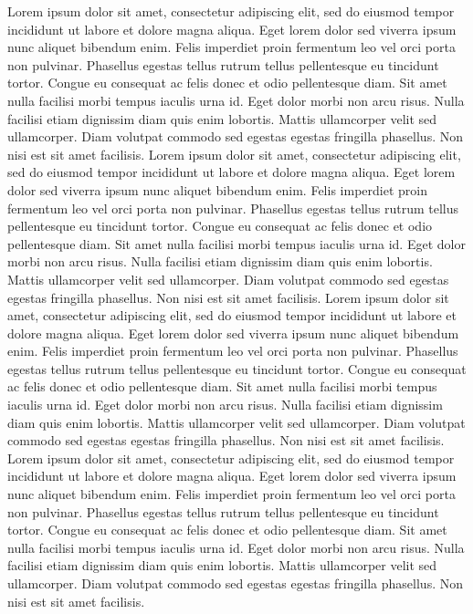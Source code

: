 \documentclass[
]{article}
\begin{document}
Lorem ipsum dolor sit amet, consectetur adipiscing elit, sed do eiusmod
tempor incididunt ut labore et dolore magna aliqua. Eget lorem dolor sed
viverra ipsum nunc aliquet bibendum enim. Felis imperdiet proin
fermentum leo vel orci porta non pulvinar. Phasellus egestas tellus
rutrum tellus pellentesque eu tincidunt tortor. Congue eu consequat ac
felis donec et odio pellentesque diam. Sit amet nulla facilisi morbi
tempus iaculis urna id. Eget dolor morbi non arcu risus. Nulla facilisi
etiam dignissim diam quis enim lobortis. Mattis ullamcorper velit sed
ullamcorper. Diam volutpat commodo sed egestas egestas fringilla
phasellus. Non nisi est sit amet facilisis. Lorem ipsum dolor sit amet,
consectetur adipiscing elit, sed do eiusmod tempor incididunt ut labore
et dolore magna aliqua. Eget lorem dolor sed viverra ipsum nunc aliquet
bibendum enim. Felis imperdiet proin fermentum leo vel orci porta non
pulvinar. Phasellus egestas tellus rutrum tellus pellentesque eu
tincidunt tortor. Congue eu consequat ac felis donec et odio
pellentesque diam. Sit amet nulla facilisi morbi tempus iaculis urna id.
Eget dolor morbi non arcu risus. Nulla facilisi etiam dignissim diam
quis enim lobortis. Mattis ullamcorper velit sed ullamcorper. Diam
volutpat commodo sed egestas egestas fringilla phasellus. Non nisi est
sit amet facilisis. Lorem ipsum dolor sit amet, consectetur adipiscing
elit, sed do eiusmod tempor incididunt ut labore et dolore magna aliqua.
Eget lorem dolor sed viverra ipsum nunc aliquet bibendum enim. Felis
imperdiet proin fermentum leo vel orci porta non pulvinar. Phasellus
egestas tellus rutrum tellus pellentesque eu tincidunt tortor. Congue eu
consequat ac felis donec et odio pellentesque diam. Sit amet nulla
facilisi morbi tempus iaculis urna id. Eget dolor morbi non arcu risus.
Nulla facilisi etiam dignissim diam quis enim lobortis. Mattis
ullamcorper velit sed ullamcorper. Diam volutpat commodo sed egestas
egestas fringilla phasellus. Non nisi est sit amet facilisis. Lorem
ipsum dolor sit amet, consectetur adipiscing elit, sed do eiusmod tempor
incididunt ut labore et dolore magna aliqua. Eget lorem dolor sed
viverra ipsum nunc aliquet bibendum enim. Felis imperdiet proin
fermentum leo vel orci porta non pulvinar. Phasellus egestas tellus
rutrum tellus pellentesque eu tincidunt tortor. Congue eu consequat ac
felis donec et odio pellentesque diam. Sit amet nulla facilisi morbi
tempus iaculis urna id. Eget dolor morbi non arcu risus. Nulla facilisi
etiam dignissim diam quis enim lobortis. Mattis ullamcorper velit sed
ullamcorper. Diam volutpat commodo sed egestas egestas fringilla
phasellus. Non nisi est sit amet facilisis.
\end{document}

